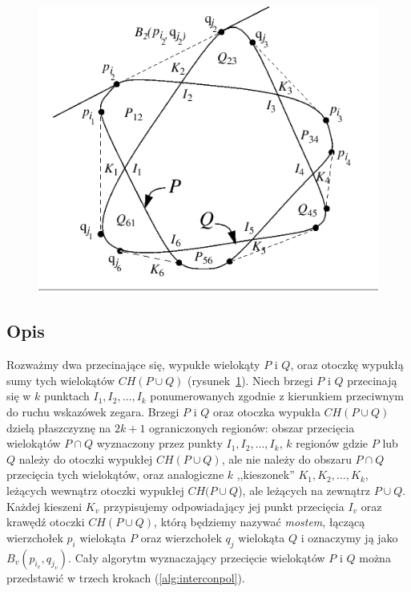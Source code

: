 \begin{figure}[htb]
  \centering
  \includegraphics[scale=0.7]{img/toussaint1}
  \caption{\label{img:toussaint1}}
\end{figure}

\subsection{Opis}
Rozważmy dwa przecinające się, wypukłe wielokąty $P$ i $Q$, oraz
otoczkę wypukłą sumy tych wielokątów $CH(P \cup Q)$
(rysunek~\ref{img:toussaint1}). Niech brzegi $P$ i $Q$ przecinają się
w $k$ punktach $I_1, I_2, \ldots, I_k$ ponumerowanych zgodnie z
kierunkiem przeciwnym do ruchu wskazówek zegara. Brzegi $P$ i $Q$ oraz
otoczka wypukła $CH(P \cup Q)$ dzielą płaszczyznę na $2k + 1$
ograniczonych regionów: obszar przecięcia wielokątów $P \cap Q$
wyznaczony przez punkty $I_1, I_2, \ldots, I_k$, $k$ regionów gdzie
$P$ lub $Q$ należy do otoczki wypukłej $CH(P \cup Q)$, ale nie należy
do obszaru $P \cap Q$ przecięcia tych wielokątów, oraz analogiczne $k$
,,kieszonek'' $K_1, K_2, \ldots, K_k$, leżących wewnątrz otoczki
wypukłej $CH(P \cup Q$), ale leżących na zewnątrz $P \cup Q$. Każdej
kieszeni $K_v$ przypisujemy odpowiadający jej punkt przecięcia $I_v$
oraz krawędź otoczki $CH(P \cup Q)$, którą będziemy nazywać
\emph{mostem}, łączącą wierzchołek $p_i$ wielokąta $P$ oraz
wierzchołek $q_j$ wielokąta $Q$ i oznaczymy ją jako $B_{v}(p_{i_v},
q_{j_v})$. Cały algorytm wyznaczający przecięcie wielokątów $P$ i $Q$
można przedstawić w trzech krokach (\ref{alg:interconpol}).

